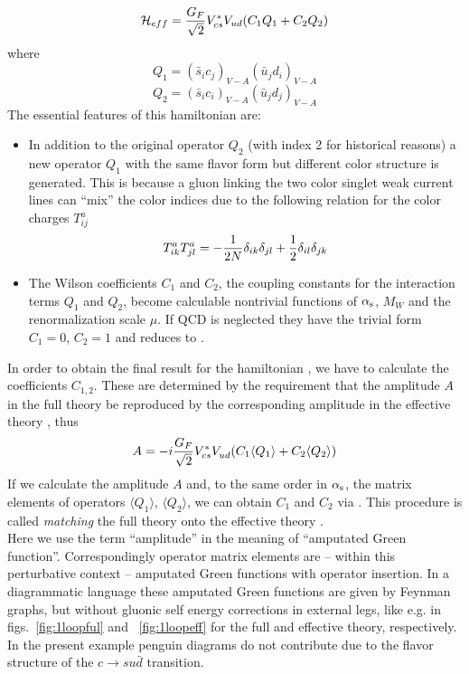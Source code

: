 \begin{equation}\label{hq12}
{\cal H}_{eff}={G_F\over\sqrt{2}}V^\ast_{cs}V_{ud}(C_1 Q_1+C_2 Q_2) \end{equation}
where
\begin{equation}\label{q1c} Q_1=(\bar s_ic_j)_{V-A}(\bar u_jd_i)_{V-A}   \end{equation}
\begin{equation}\label{q2c} Q_2=(\bar s_ic_i)_{V-A}(\bar u_jd_j)_{V-A}   \end{equation}
The essential features of this hamiltonian are:
\begin{itemize}
\item In addition to the original operator $Q_2$ (with index 2 for
historical reasons) a new operator $Q_1$ with the same flavor form
but different color structure is generated. This is because a gluon
linking the two color singlet weak current lines can ``mix'' the color
indices due to the following relation for the color charges $T^a_{ij}$
\begin{equation}\label{tata}
T^a_{ik}T^a_{jl}=-{1\over 2N}\delta_{ik}\delta_{jl}+{1\over 2}
\delta_{il}\delta_{jk}   \end{equation}
\item The Wilson coefficients $C_1$ and $C_2$, the coupling constants
for the interaction terms $Q_1$ and $Q_2$, become calculable nontrivial
functions of $\alpha_{\rm s}$, $M_W$ and the renormalization scale $\mu$.
If QCD is neglected they have the trivial form $C_1=0$, $C_2=1$ and
 reduces to .
\end{itemize}
In order to obtain the final result for the hamiltonian , we
have to calculate the coefficients $C_{1, 2}$. These are determined
by the requirement that the amplitude $A$ in the full theory be
reproduced by the corresponding amplitude in the effective theory
, thus
\begin{equation}\label{acq}
A=-i{G_F\over\sqrt{2}}V^*_{cs}V_{ud}^{}(C_1\langle Q_1\rangle +
C_2\langle Q_2\rangle)   \end{equation}
If we calculate the amplitude $A$ and, to the same order in $\alpha_{\rm s}$,
the matrix elements of operators $\langle Q_1\rangle$,
$\langle Q_2\rangle$, we can obtain $C_1$ and $C_2$ via .
This procedure is called {\it matching} the full theory onto the
effective theory .
\\
Here we use the term ``amplitude'' in the meaning of ``amputated Green
function''. Correspondingly operator matrix elements are -- within this
perturbative context -- amputated Green functions with operator
insertion. In a diagrammatic language these amputated Green functions
are given by Feynman graphs, but without gluonic self energy
corrections in external legs, like e.g. in figs.~\ref{fig:1loopful} and
~\ref{fig:1loopeff} for the full and effective theory, respectively.
In the present example penguin diagrams do not contribute due to the
flavor structure of the $c \to s u \bar d$ transition.

